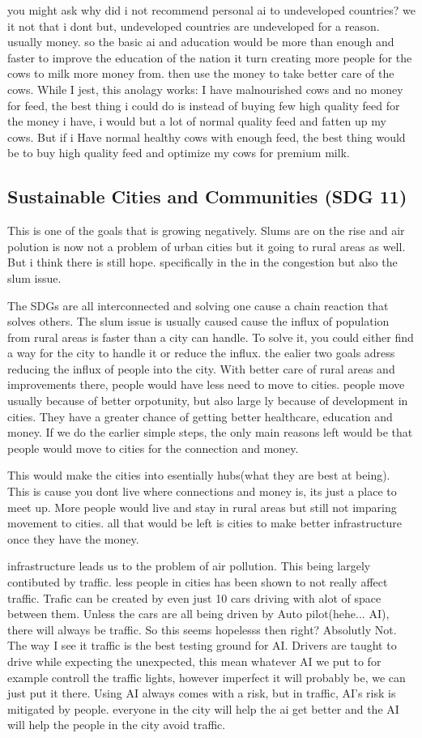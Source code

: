 you might ask why did i not recommend personal ai to undeveloped countries? we it not that i dont but, undeveloped countries are undeveloped for a reason. usually money. so the basic ai and aducation would be more than enough and faster to improve the education of the nation it turn creating more people for the cows to milk more money from. then use the money to take better care of the cows. While I jest, this anolagy works:
I have malnourished cows and no money for feed, the best thing i could do is instead of buying few high quality feed for the money i have, i would but a lot of normal quality feed and fatten up my cows.
But if i Have normal healthy cows with enough feed, the best thing would be to buy high quality feed and optimize my cows for premium milk.
\subsection{Sustainable Cities and Communities (SDG 11)}
This is one of the goals that is growing negatively. Slums are on the rise and air polution is now not a problem of urban cities but it going to rural areas as well. But i think there is still hope. specifically in the in the congestion but also the slum issue.

The SDGs are all interconnected and solving one cause a chain reaction that solves others.  The slum issue is usually caused cause the influx of population from rural areas is faster than a city can handle. To solve it, you could either find a way for the city to handle it or reduce the influx. the ealier two goals adress reducing the influx of people into the city. With better care of rural areas and improvements there, people would have less need to move to cities. people move usually because of better orpotunity, but also large ly because of development in cities. They have a greater chance of getting better healthcare, education and money. If we do the earlier simple steps, the only main reasons left would be that people would move to cities for the connection and money. 

This would make the cities into esentially hubs(what they are best at being). This is cause you dont live where connections and money is, its just a place to meet up. More people would live and stay in rural areas but still not imparing movement to cities. all that would be left is cities to make better infrastructure once they have the money.

infrastructure leads us to the problem of air pollution. This being largely contibuted by traffic. less people in cities has been shown to not really affect traffic. Trafic can be created by even just 10 cars driving with alot of space between them. Unless the cars are all being driven by Auto pilot(hehe... AI), there will always be traffic. So this seems hopelesss then right? Absolutly Not. The way I see it traffic is the best testing ground for AI. Drivers are taught to drive while expecting the unexpected, this mean whatever AI we put to for example controll the traffic lights, however imperfect it will probably be, we can just put it there. Using AI always comes with a risk, but in traffic, AI's risk is mitigated by people. everyone in the city will help the ai get better and the AI will help the people in the city avoid traffic. 

